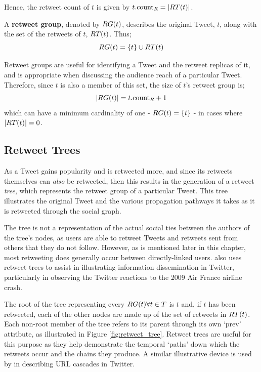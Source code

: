 Hence, the retweet count of $t$ is given by $ t.\textrm{count}_R = \left\vert{RT(t)}\right\vert $.


\begin{mydefinition}
\label{definition:retweet_group}
A \textbf{retweet group}, denoted by $RG(t)$, describes the original Tweet, $t$, along with the set of the retweets of $t$, $RT(t)$. Thus;
\[
    RG(t) = \left\{t\right\} \cup RT(t)
\]
\end{mydefinition}


Retweet groups are useful for identifying a Tweet and the retweet replicas of it, and is appropriate when discussing the audience reach of a particular Tweet. Therefore, since $t$ is also a member of this set, the size of $t$'s retweet group is; 
\[
	\left\vert{
RG(t)}\right\vert = t.\textrm{count}_R + 1 
\] 
which can have a minimum cardinality of one - $RG(t) = \left\{t\right\}$ - in cases where $|RT(t)| = 0$.
 

\subsection{Retweet Trees}
As a Tweet gains popularity and is retweeted more, and since its retweets themselves can \textit{also} be retweeted, then this results in the generation of a retweet \textit{tree}, which represents the retweet group of a particular Tweet. This tree illustrates the original Tweet and the various propagation pathways it takes as it is retweeted through the social graph. 

The tree is not a representation of the actual social ties between the authors of the tree's nodes, as users are able to retweet Tweets and retweets sent from others that they do not follow. However, as is mentioned later in this chapter, most retweeting does generally occur between directly-linked users. \cite{kwak10} also uses retweet trees to assist in illustrating information dissemination in Twitter, particularly in observing the Twitter reactions to the 2009 Air France airline crash.

The root of the tree representing every $RG(t) \forall t \in T$ is $t$ and, if $t$ has been retweeted, each of the other nodes are made up of the set of retweets in $RT(t)$. Each non-root member of the tree refers to its parent through its own `$\textrm{prev}$' attribute, as illustrated in Figure \ref{fig:retweet_tree}. Retweet trees are useful for this purpose as they help demonstrate the temporal `paths' down which the retweets occur and the chains they produce. A similar illustrative device is used by \cite{galuba10} in describing URL cascades in Twitter.


